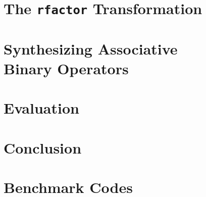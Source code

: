 \documentclass[10pt]{main}
\newcommand{\code}[1]{\texttt{#1}}
\begin{document}
\section{The \code{rfactor} Transformation}
\label{assoc_red}


\section{Synthesizing Associative\\
Binary Operators}
\label{synthesize}


\section{Evaluation}
\label{evaluation}


\section{Conclusion}
\label{conclusion}



%
%

\appendix
\section*{Benchmark Codes}

\end{document}
